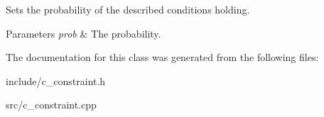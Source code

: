 \-Sets the probability of the described conditions holding. 
\begin{DoxyParams}{\-Parameters}
{\em prob} & \-The probability. \\
\hline
\end{DoxyParams}


\-The documentation for this class was generated from the following files\-:\begin{DoxyCompactItemize}
\item 
include/c\-\_\-constraint.\-h\item 
src/c\-\_\-constraint.\-cpp\end{DoxyCompactItemize}
